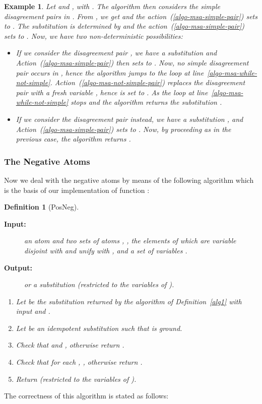 \documentclass[fleqn]{tlp}
\newtheorem{definition}{Definition} \newtheorem{example}{Example} \newtheorem{lemma}{Lemma} \newtheorem{proposition}{Proposition} \newtheorem{theorem}{Theorem} \newtheorem{corollary}{Corollary}
\begin{document}
\begin{example}\label{ex-1-g}
  Let  and , with
  . 
  The algorithm then considers
  the simple disagreement pairs in . From , we get
   and the
  action~(\ref{algo-msa-simple-pair}) sets  to
    .
   The substitution  is determined by  and the
     action~(\ref{algo-msa-simple-pair}) sets  to
     .
   Now, we have two non-deterministic possibilities:
   \begin{itemize}
   \item If we consider the disagreement pair , we have a
     substitution  and
     Action~(\ref{algo-msa-simple-pair}) then sets  to
     . Now, no simple disagreement pair
     occurs in , hence the algorithm jumps to the loop at
     line~\ref{algo-msa-while-not-simple}.
     Action~(\ref{algo-msa-not-simple-pair}) replaces the disagreement
     pair  with a fresh variable , hence  is set
     to .  As  the loop at
     line~\ref{algo-msa-while-not-simple} stops and the algorithm
     returns the substitution .
   \item If we consider the disagreement pair  instead, we have  a
     substitution , and
     Action~(\ref{algo-msa-simple-pair}) sets  to
     . Now, by proceeding as in the
     previous case, the algorithm returns .
   \end{itemize}
\end{example}

\subsubsection{The Negative Atoms}
\label{section-algo-all-pos-neg}


Now we deal with the negative atoms 
by means of the following
algorithm which is the basis of our implementation of function
:

\begin{definition}[PosNeg] \label{alg2}
\begin{description}
\item[\textbf{Input:}] an atom  and two sets of atoms
  , , the elements of which are variable
  disjoint with  and unify with , and
  a set of variables . 
\item[\textbf{Output:}]  or a substitution 
  (restricted to the variables of ).
\end{description}

\begin{enumerate}\itemsep2pt
\item Let  be the substitution returned by the algorithm
  of Definition~\ref{alg1}
  with input  and .
\item Let   be an idempotent substitution such that
   is ground.
\item Check that 
   and
  ,
  otherwise return .
\item Check that for each , 
  ,
  otherwise return .
\item Return 
  (restricted to the variables of ). 
\end{enumerate}
\end{definition}
The correctness of this algorithm is stated as follows:
\end{document}

